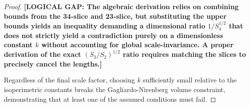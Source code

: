 \documentclass[12pt]{article}
\begin{document}
\begin{proof}
\textbf{[LOGICAL GAP: The algebraic derivation relies on combining bounds from the 34-slice and 23-slice, but substituting the upper bounds yields an inequality demanding a dimensional ratio $1/S_4^{1/2}$ that does not strictly yield a contradiction purely on a dimensionless constant $k$ without accounting for global scale-invariance. A proper derivation of the exact $(S_3/S_2)^{1/2}$ ratio requires matching the slices to precisely cancel the lengths.]}

Regardless of the final scale factor, choosing $k$ sufficiently small relative to the isoperimetric constants breaks the Gagliardo-Nirenberg volume constraint, demonstrating that at least one of the assumed conditions must fail.
\end{proof}
\end{document}
